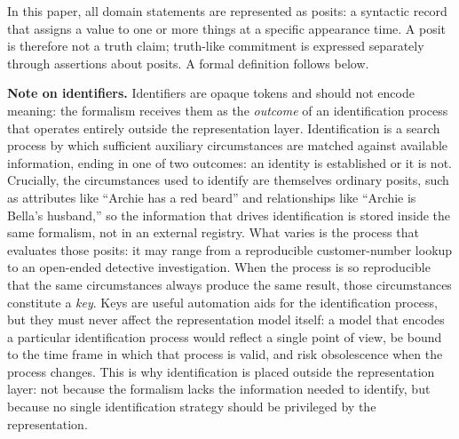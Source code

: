 \documentclass[a4paper,fleqn]{cas-sc}
\begin{document}
In this paper, all domain statements are represented as posits: a syntactic record that assigns a value to one or more things at a specific appearance time. A posit is therefore not a truth claim; truth-like commitment is expressed separately through assertions about posits. A formal definition follows below.

\textbf{Note on identifiers.} Identifiers are opaque tokens and should not encode meaning: the formalism receives them as the \emph{outcome} of an identification process that operates entirely outside the representation layer. Identification is a search process by which sufficient auxiliary circumstances are matched against available information, ending in one of two outcomes: an identity is established or it is not. Crucially, the circumstances used to identify are themselves ordinary posits, such as attributes like ``Archie has a red beard'' and relationships like ``Archie is Bella's husband,'' so the information that drives identification is stored inside the same formalism, not in an external registry. What varies is the process that evaluates those posits: it may range from a reproducible customer-number lookup to an open-ended detective investigation. When the process is so reproducible that the same circumstances always produce the same result, those circumstances constitute a \emph{key}. Keys are useful automation aids for the identification process, but they must never affect the representation model itself: a model that encodes a particular identification process would reflect a single point of view, be bound to the time frame in which that process is valid, and risk obsolescence when the process changes. This is why identification is placed outside the representation layer: not because the formalism lacks the information needed to identify, but because no single identification strategy should be privileged by the representation.
\end{document}
